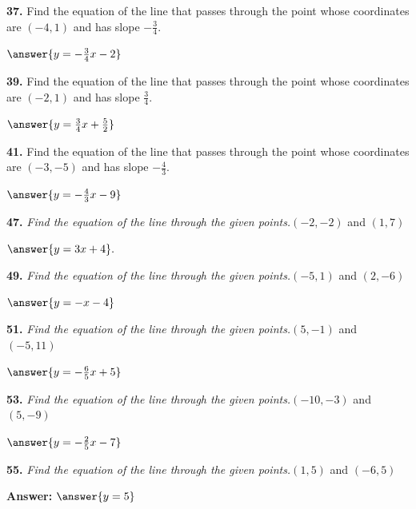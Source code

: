 \documentclass{ximera}
\begin{document}
\begin{problem}
\textbf{37.} Find the equation of the line that passes through the point whose coordinates are
  $(-4, 1)$ and has slope $-\frac{3}{4}$.

$  \answer{y = -\frac{3}{4}x -2}   $
\end{problem}

\begin{problem}
\textbf{39.} Find the equation of the line that passes through the point whose coordinates are
  $(-2, 1)$ and has slope $\frac{3}{4}$.

$ \answer{y = \frac{3}{4}x +\frac{5}{2}} $
\end{problem}

\begin{problem}
\textbf{41.} Find the equation of the line that passes through the point whose coordinates are
  $(-3, -5)$ and has slope $-\frac{4}{3}$.

$ \answer{y = -\frac{4}{3}x -9}  $
\end{problem}

\begin{problem}
\textbf{47.} \emph{Find the equation of the line through the given points.}\quad $(-2, -2)$ and $(1, 7)$

$ \answer{y = 3x +4}. $
\end{problem}

\begin{problem}
\textbf{49.} \emph{Find the equation of the line through the given points.}\quad $(-5, 1)$ and $(2, -6)$

$ \answer{y = -x -4} $
\end{problem}

\begin{problem}
\textbf{51.} \emph{Find the equation of the line through the given points.}\quad $(5, -1)$ and $(-5, 11)$

$ \answer{y = -\frac{6}{5}x +5} $
\end{problem}

\begin{problem}
\textbf{53.} \emph{Find the equation of the line through the given points.}\quad $(-10, -3)$ and $(5, -9)$

$ \answer{y = -\frac{2}{5}x -7} $
\end{problem}

\begin{problem}
\textbf{55.} \emph{Find the equation of the line through the given points.}\quad $(1, 5)$ and $(-6, 5)$

\textbf{Answer:} $\answer{y = 5}$
\end{problem}
\end{document}
